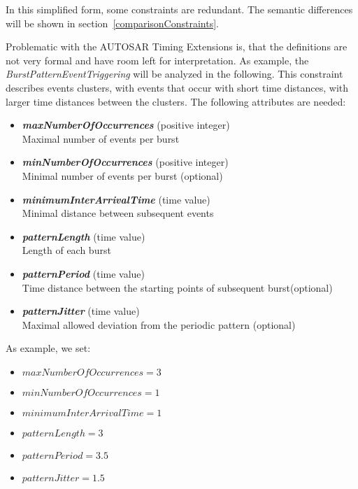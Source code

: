 	In this simplified form, some constraints are redundant. The semantic differences will be shown in section~\ref{comparisonConstraints}.

	Problematic with the AUTOSAR Timing Extensions is, that the definitions are not very formal and have room left for interpretation. As example, the \emph{BurstPatternEventTriggering} will be analyzed in the following. This constraint describes events clusters, with events that occur with short time distances, with larger time distances between the clusters. The following attributes are needed:
	\begin{itemize}
		\item
			\textbf{\emph{maxNumberOfOccurrences}} (positive integer)\\
			Maximal number of events per burst
		\item
			\textbf{\emph{minNumberOfOccurrences}} (positive integer)\\
			Minimal number of events per burst (optional)
		\item
			\textbf{\emph{minimumInterArrivalTime}} (time value)\\
			Minimal distance between subsequent events
		\item
			\textbf{\emph{patternLength}} (time value)\\
			Length of each burst
		\item
			\textbf{\emph{patternPeriod}} (time value)\\
			Time distance between the starting points of subsequent burst(optional)
		\item
			\textbf{\emph{patternJitter}} (time value)\\
			Maximal allowed deviation from the periodic pattern	(optional)
	\end{itemize}

As example, we set:
\begin{itemize}
	\item
	$maxNumberOfOccurrences = 3$
	\item
	$minNumberOfOccurrences = 1$
	\item
	$minimumInterArrivalTime = 1$
	\item
	$patternLength = 3$
	\item
	$patternPeriod = 3.5$
	\item
	$patternJitter = 1.5$
\end{itemize}

